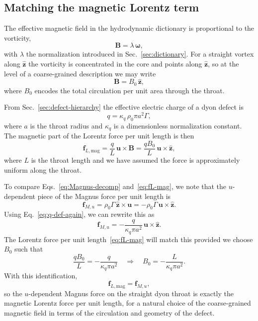 \documentclass[11pt]{article}
\begin{document}
\subsection{Matching the magnetic Lorentz term}

The effective magnetic field in the hydrodynamic dictionary is proportional to the vorticity,
\begin{equation}
\mathbf{B} = \lambda\,\boldsymbol{\omega},
\end{equation}
with $\lambda$ the normalization introduced in Sec.~\ref{sec:dictionary}.  For a straight vortex along $\hat{\mathbf{z}}$ the vorticity is concentrated in the core and points along $\hat{\mathbf{z}}$, so at the level of a coarse-grained description we may write
\begin{equation}
\mathbf{B} = B_0\,\hat{\mathbf{z}},
\end{equation}
where $B_0$ encodes the total circulation per unit area through the throat.

From Sec.~\ref{sec:defect-hierarchy} the effective electric charge of a dyon defect is
\begin{equation}
q = \kappa_q\,\rho_0 \pi a^2 \Gamma,
\label{eq:q-def-again}
\end{equation}
where $a$ is the throat radius and $\kappa_q$ is a dimensionless normalization constant.  The magnetic part of the Lorentz force per unit length is then
\begin{equation}
\mathbf{f}_{L,\mathrm{mag}}
= \frac{q}{L}\,\mathbf{u} \times \mathbf{B}
= \frac{q B_0}{L}\,\mathbf{u} \times \hat{\mathbf{z}},
\label{eq:fL-mag}
\end{equation}
where $L$ is the throat length and we have assumed the force is approximately uniform along the throat.

To compare Eqs.~\eqref{eq:Magnus-decomp} and~\eqref{eq:fL-mag}, we note that the $u$-dependent piece of the Magnus force per unit length is
\begin{equation}
\mathbf{f}_{M,u}
= \rho_0 \Gamma\,\hat{\mathbf{z}} \times \mathbf{u}
= -\rho_0 \Gamma\,\mathbf{u} \times \hat{\mathbf{z}}.
\end{equation}
Using Eq.~\eqref{eq:q-def-again}, we can rewrite this as
\begin{equation}
\mathbf{f}_{M,u}
= -\frac{q}{\kappa_q \pi a^2}\,\mathbf{u} \times \hat{\mathbf{z}}.
\end{equation}
The Lorentz force per unit length~\eqref{eq:fL-mag} will match this provided we choose $B_0$ such that
\begin{equation}
\frac{q B_0}{L} = -\frac{q}{\kappa_q \pi a^2}
\quad\Longrightarrow\quad
B_0 = -\frac{L}{\kappa_q \pi a^2}.
\end{equation}
With this identification,
\begin{equation}
\mathbf{f}_{L,\mathrm{mag}}
= \mathbf{f}_{M,u},
\end{equation}
so the $u$-dependent Magnus force on the straight dyon throat is exactly the magnetic Lorentz force per unit length, for a natural choice of the coarse-grained magnetic field in terms of the circulation and geometry of the defect.
\end{document}
